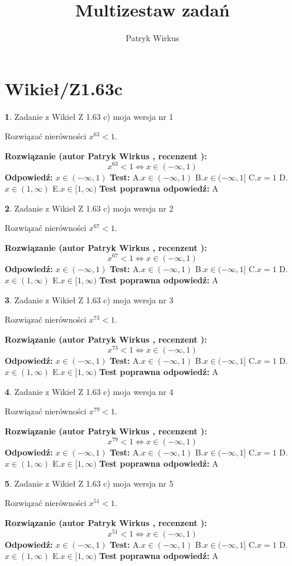 \documentclass[12pt, a4paper]{article}
\title{Multizestaw zadań}
\author{Patryk Wirkus}
\date{}
\theoremstyle{definition} %
\newtheorem{zad}{}
\newcommand{\kategoria}[1]{\section{#1}}
\newcommand{\zadStart}[1]{\begin{zad}#1\newline}
\newcommand{\zadStop}{\end{zad}}
\newcommand{\rozwStart}[2]{\noindent \textbf{Rozwiązanie (autor #1 , recenzent #2): }\newline}
\newcommand{\rozwStop}{\newline}
\newcommand{\odpStart}{\noindent \textbf{Odpowiedź:}\newline}
\newcommand{\odpStop}{\newline}
\newcommand{\testStart}{\noindent \textbf{Test:}\newline}
\newcommand{\testStop}{\newline}
\newcommand{\kluczStart}{\noindent \textbf{Test poprawna odpowiedź:}\newline}
\newcommand{\kluczStop}{\newline}
\begin{document}
\maketitle

\kategoria{Wikieł/Z1.63c}


\zadStart{Zadanie z Wikieł Z 1.63 c) moja wersja nr 1}

Rozwiązać nierówności $x^{63} < 1$.
\zadStop
\rozwStart{Patryk Wirkus}{}
$$x^{63} < 1 \iff x \in (-\infty,1)$$
\rozwStop
\odpStart
$x \in (-\infty,1)$
\odpStop
\testStart
A.$x \in (-\infty,1)$ B.$x \in (-\infty,1]$ C.$x = 1$ D.$x \in (1,\infty)$ E.$x \in [1,\infty)$
\testStop
\kluczStart
A
\kluczStop



\zadStart{Zadanie z Wikieł Z 1.63 c) moja wersja nr 2}

Rozwiązać nierówności $x^{67} < 1$.
\zadStop
\rozwStart{Patryk Wirkus}{}
$$x^{67} < 1 \iff x \in (-\infty,1)$$
\rozwStop
\odpStart
$x \in (-\infty,1)$
\odpStop
\testStart
A.$x \in (-\infty,1)$ B.$x \in (-\infty,1]$ C.$x = 1$ D.$x \in (1,\infty)$ E.$x \in [1,\infty)$
\testStop
\kluczStart
A
\kluczStop



\zadStart{Zadanie z Wikieł Z 1.63 c) moja wersja nr 3}

Rozwiązać nierówności $x^{73} < 1$.
\zadStop
\rozwStart{Patryk Wirkus}{}
$$x^{73} < 1 \iff x \in (-\infty,1)$$
\rozwStop
\odpStart
$x \in (-\infty,1)$
\odpStop
\testStart
A.$x \in (-\infty,1)$ B.$x \in (-\infty,1]$ C.$x = 1$ D.$x \in (1,\infty)$ E.$x \in [1,\infty)$
\testStop
\kluczStart
A
\kluczStop



\zadStart{Zadanie z Wikieł Z 1.63 c) moja wersja nr 4}

Rozwiązać nierówności $x^{79} < 1$.
\zadStop
\rozwStart{Patryk Wirkus}{}
$$x^{79} < 1 \iff x \in (-\infty,1)$$
\rozwStop
\odpStart
$x \in (-\infty,1)$
\odpStop
\testStart
A.$x \in (-\infty,1)$ B.$x \in (-\infty,1]$ C.$x = 1$ D.$x \in (1,\infty)$ E.$x \in [1,\infty)$
\testStop
\kluczStart
A
\kluczStop



\zadStart{Zadanie z Wikieł Z 1.63 c) moja wersja nr 5}

Rozwiązać nierówności $x^{51} < 1$.
\zadStop
\rozwStart{Patryk Wirkus}{}
$$x^{51} < 1 \iff x \in (-\infty,1)$$
\rozwStop
\odpStart
$x \in (-\infty,1)$
\odpStop
\testStart
A.$x \in (-\infty,1)$ B.$x \in (-\infty,1]$ C.$x = 1$ D.$x \in (1,\infty)$ E.$x \in [1,\infty)$
\testStop
\kluczStart
A
\kluczStop
\end{document}

